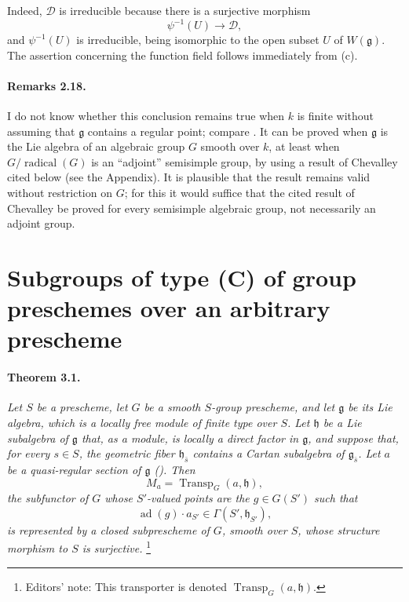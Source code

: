Indeed, \(\mathcal D\) is irreducible because there is a surjective
morphism
\[
  \psi^{-1}(U)\longrightarrow\mathcal D,
\]
and \(\psi^{-1}(U)\) is irreducible, being isomorphic to the open
subset \(U\) of \(W(\mathfrak g)\). The assertion concerning the
function field follows immediately from \textup{(c)}.

\paragraph{\textbf{Remarks 2.18.}}
I do not know whether this conclusion remains true when \(k\) is
finite without assuming that \(\mathfrak g\) contains a regular
point; compare . It can be proved when \(\mathfrak g\) is the
Lie algebra of an algebraic group \(G\) smooth over \(k\), at least
when \(G/\operatorname{radical}(G)\) is an ``adjoint'' semisimple
group, by using a result of Chevalley cited below \textup{(see the
Appendix)}. It is plausible that the result remains valid without
restriction on \(G\); for this it would suffice that the cited
result of Chevalley be proved for every semisimple algebraic group,
not necessarily an adjoint group.



\section{Subgroups of type \textup{(C)} of group preschemes over an
arbitrary prescheme}

\paragraph{\textbf{Theorem 3.1.}}
{\itshape Let \(S\) be a prescheme, let \(G\) be a smooth
\(S\)-group prescheme, and let \(\mathfrak g\) be its Lie algebra,
which is a locally free module of finite type over \(S\). Let
\(\mathfrak h\) be a Lie subalgebra of \(\mathfrak g\) that, as a
module, is locally a direct factor in \(\mathfrak g\), and suppose
that, for every \(s\in S\), the geometric fiber
\(\mathfrak h_{\bar s}\) contains a Cartan subalgebra of
\(\mathfrak g_{\bar s}\). Let \(a\) be a quasi-regular section of
\(\mathfrak g\) \textup{()}. Then
\[
  M_a=\operatorname{Transp}_G(a,\mathfrak h),
\]
the subfunctor of \(G\) whose \(S'\)-valued points are the
\(g\in G(S')\) such that
\[
  \operatorname{ad}(g)\cdot a_{S'}
    \in\Gamma(S',\mathfrak h_{S'}),
\]
is represented by a closed subprescheme of \(G\), smooth over
\(S\), whose structure morphism to \(S\) is surjective.}
\footnote{Editors' note: This transporter is denoted
\(\operatorname{Transp}_G(a,\mathfrak h)\).}

